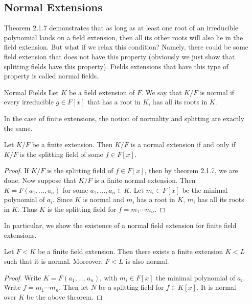 \documentclass[a4paper]{article}
\begin{document}
\subsection{Normal Extensions}
Theorem 2.1.7 demonstrates that as long as at least one root of an irreducible polynomial lands on a field extension, then all its other roots will also lie in the field extension. But what if we relax this condition? Namely, there could be some field extension that does not have this property (obviously we just show that splitting fields have this property). Fields extensions that have this type of property is called normal fields. 

\begin{defn}{Normal Fields}{} Let $K$ be a field extension of $F$. We say that $K/F$ is normal if every irreducible $g\in F[x]$ that has a root in $K$, has all its roots in $K$. 
\end{defn}

In the case of finite extensions, the notion of normality and splitting are exactly the same. 

\begin{lmm}{}{} Let $K/F$ be a finite extension. Then $K/F$ is a normal extension if and only if $K/F$ is the splitting field of some $f\in F[x]$. \tcbline
\begin{proof}
If $K/F$ is the splitting field of $f\in F[x]$, then by theorem 2.1.7, we are done. Now suppose that $K/F$ is a finite normal extension. Then $K=F(a_1,\dots,a_n)$ for some $a_1,\dots,a_n\in K$. Let $m_i\in F[x]$ be the minimal polynomial of $a_i$. Since $K$ is normal and $m_i$ has a root in $K$, $m_i$ has all its roots in $K$. Thus $K$ is the splitting field for $f=m_1\cdots m_n$. 
\end{proof}
\end{lmm}

In particular, we show the existence of a normal field extension for finite field extensions. 

\begin{crl}{}{} Let $F<K$ be a finite field extension. Then there exists a finite extension $K<L$ such that it is normal. Moreover, $F<L$ is also normal. \tcbline
\begin{proof}
Write $K=F(a_1,\dots,a_n)$, with $m_i\in F[x]$ the minimal polynomial of $a_i$. Write $f=m_1\cdots m_n$. Then let $N$ be a splitting field for $f\in K[x]$. It is normal over $K$ be the above theorem. 
\end{proof}
\end{crl}
\end{document}
